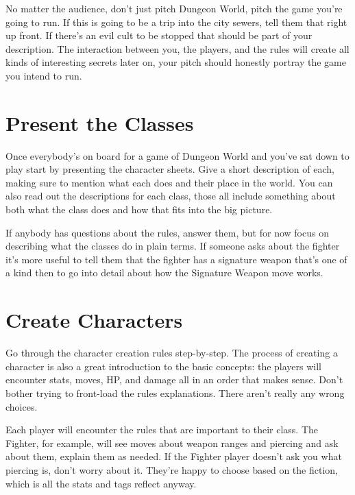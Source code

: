 No matter the audience, don't just pitch Dungeon World, pitch the game you're going to run. If this is going to be a trip into the city sewers, tell them that right up front. If there's an evil cult to be stopped that should be part of your description. The interaction between you, the players, and the rules will create all kinds of interesting secrets later on, your pitch should honestly portray the game you intend to run.

 
\section{Present the Classes}    
 

Once everybody's on board for a game of Dungeon World and you've sat down to play start by presenting the character sheets. Give a short description of each, making sure to mention what each does and their place in the world. You can also read out the descriptions for each class, those all include something about both what the class does and how that fits into the big picture.

 

If anybody has questions about the rules, answer them, but for now focus on describing what the classes do in plain terms. If someone asks about the fighter it's more useful to tell them that the fighter has a signature weapon that's one of a kind then to go into detail about how the Signature Weapon move works.

 
\section{Create Characters}    
 

Go through the character creation rules step-by-step. The process of creating a character is also a great introduction to the basic concepts: the players will encounter stats, moves, HP, and damage all in an order that makes sense. Don't bother trying to front-load the rules explanations. There aren't really any wrong choices.

 

Each player will encounter the rules that are important to their class. The Fighter, for example, will see moves about weapon ranges and piercing and ask about them, explain them as needed. If the Fighter player doesn't ask you what piercing is, don't worry about it. They're happy to choose based on the fiction, which is all the stats and tags reflect anyway.

